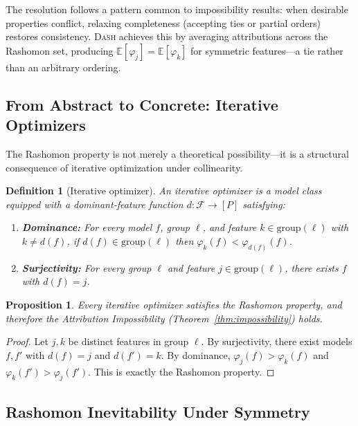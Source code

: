 \documentclass{article}
\newtheorem{definition}[theorem]{Definition}
\newtheorem{proposition}[theorem]{Proposition}
\newcommand{\E}{\mathbb{E}}
\newcommand{\DASH}{\textsc{Dash}}
\begin{document}
The resolution follows a pattern common to impossibility results: when desirable properties conflict, relaxing completeness (accepting ties or partial orders) restores consistency.
\DASH{} achieves this by averaging attributions across the Rashomon set, producing $\E[\varphi_j] = \E[\varphi_k]$ for symmetric features---a tie rather than an arbitrary ordering.

\subsection{From Abstract to Concrete: Iterative Optimizers}
\label{sec:iterative}

The Rashomon property is not merely a theoretical possibility---it is a structural consequence of iterative optimization under collinearity.

\begin{definition}[Iterative optimizer]
\label{def:iterative}
An \emph{iterative optimizer} is a model class equipped with a dominant-feature function $d\colon \mathcal{F} \to [P]$ satisfying:
\begin{enumerate}
    \item \textbf{Dominance:} For every model $f$, group $\ell$, and feature $k \in \text{group}(\ell)$ with $k \neq d(f)$, if $d(f) \in \text{group}(\ell)$ then $\varphi_k(f) < \varphi_{d(f)}(f)$.
    \item \textbf{Surjectivity:} For every group $\ell$ and feature $j \in \text{group}(\ell)$, there exists $f$ with $d(f) = j$.
\end{enumerate}
\end{definition}

\begin{proposition}
\label{prop:iterative-rashomon}
Every iterative optimizer satisfies the Rashomon property, and therefore the Attribution Impossibility (Theorem~\ref{thm:impossibility}) holds.
\end{proposition}

\begin{proof}
Let $j, k$ be distinct features in group $\ell$.
By surjectivity, there exist models $f, f'$ with $d(f) = j$ and $d(f') = k$.
By dominance, $\varphi_j(f) > \varphi_k(f)$ and $\varphi_k(f') > \varphi_j(f')$.
This is exactly the Rashomon property.
\end{proof}

\subsection{Rashomon Inevitability Under Symmetry}
\label{sec:rashomon-inevitability}
\end{document}
